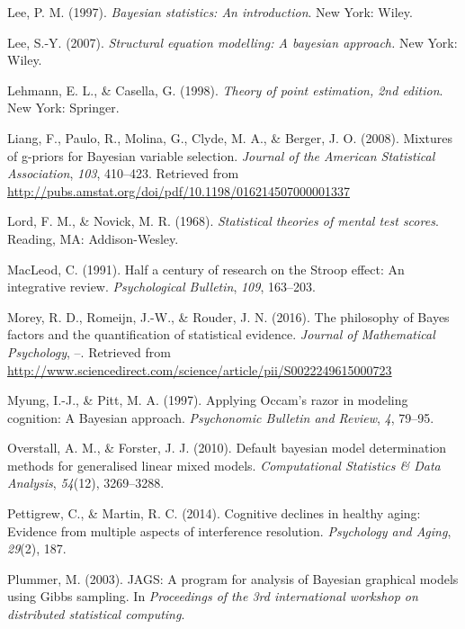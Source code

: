\documentclass[english,man]{apa6}
\theoremstyle{definition}
\theoremstyle{definition}
\theoremstyle{remark}
\begin{document}
\hypertarget{ref-Lee:1997}{}
Lee, P. M. (1997). \emph{Bayesian statistics: An introduction}. New
York: Wiley.

\hypertarget{ref-Lee:2007}{}
Lee, S.-Y. (2007). \emph{Structural equation modelling: A bayesian
approach.} New York: Wiley.

\hypertarget{ref-Lehmann:Casella:1998}{}
Lehmann, E. L., \& Casella, G. (1998). \emph{Theory of point estimation,
2nd edition}. New York: Springer.

\hypertarget{ref-Liang:etal:2008}{}
Liang, F., Paulo, R., Molina, G., Clyde, M. A., \& Berger, J. O. (2008).
Mixtures of g-priors for Bayesian variable selection. \emph{Journal of
the American Statistical Association}, \emph{103}, 410--423. Retrieved
from \url{http://pubs.amstat.org/doi/pdf/10.1198/016214507000001337}

\hypertarget{ref-Lord:Novick:1968}{}
Lord, F. M., \& Novick, M. R. (1968). \emph{Statistical theories of
mental test scores}. Reading, MA: Addison-Wesley.

\hypertarget{ref-MacLeod:1991}{}
MacLeod, C. (1991). Half a century of research on the Stroop effect: An
integrative review. \emph{Psychological Bulletin}, \emph{109}, 163--203.

\hypertarget{ref-Morey:etal:2016}{}
Morey, R. D., Romeijn, J.-W., \& Rouder, J. N. (2016). The philosophy of
Bayes factors and the quantification of statistical evidence.
\emph{Journal of Mathematical Psychology}, --. Retrieved from
\url{http://www.sciencedirect.com/science/article/pii/S0022249615000723}

\hypertarget{ref-Myung:Pitt:1997}{}
Myung, I.-J., \& Pitt, M. A. (1997). Applying Occam's razor in modeling
cognition: A Bayesian approach. \emph{Psychonomic Bulletin and Review},
\emph{4}, 79--95.

\hypertarget{ref-Overstall:Forster:2010}{}
Overstall, A. M., \& Forster, J. J. (2010). Default bayesian model
determination methods for generalised linear mixed models.
\emph{Computational Statistics \& Data Analysis}, \emph{54}(12),
3269--3288.

\hypertarget{ref-Pettigrew:Martin:2014}{}
Pettigrew, C., \& Martin, R. C. (2014). Cognitive declines in healthy
aging: Evidence from multiple aspects of interference resolution.
\emph{Psychology and Aging}, \emph{29}(2), 187.

\hypertarget{ref-Plummer:2003}{}
Plummer, M. (2003). JAGS: A program for analysis of Bayesian graphical
models using Gibbs sampling. In \emph{Proceedings of the 3rd
international workshop on distributed statistical computing}.
\end{document}
